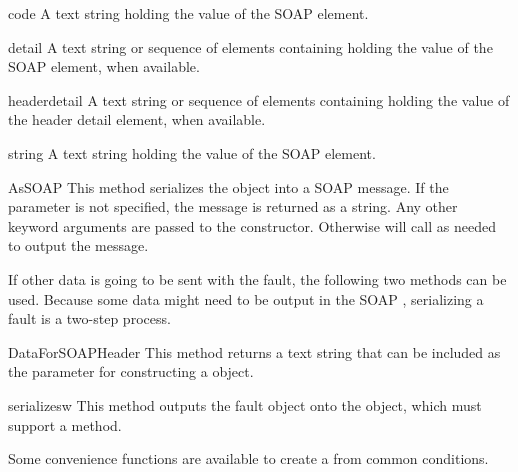 \begin{memberdesc}{code}
A text string holding the value of the SOAP  element.
\end{memberdesc}

\begin{memberdesc}{detail}
A text string or sequence of elements containing holding the value of the
SOAP  element, when available.
\end{memberdesc}

\begin{memberdesc}{headerdetail}
A text string or sequence of elements containing holding the value of the
\ZSI{} header detail element, when available.
\end{memberdesc}

\begin{memberdesc}{string}
A text string holding the value of the SOAP  element.
\end{memberdesc}

\begin{methoddesc}{AsSOAP}{}
This method serializes the  object into a SOAP message.
If the  parameter is not specified, the message is returned
as a string.
Any other keyword arguments are passed to the  constructor.
Otherwise  will call  as needed
to output the message.
\end{methoddesc}

If other data is going to be sent with the fault, the following
two methods can be used.
Because some data might need to be output in the SOAP ,
serializing a fault is a two-step process.

\begin{methoddesc}{DataForSOAPHeader}{}
This method returns a text string that can be included as the
 parameter for constructing a  object.
\end{methoddesc}

\begin{methoddesc}{serialize}{sw}
This method outputs the fault object onto the  object,
which must support a  method.
\end{methoddesc}

Some convenience functions are available to create a 
from common conditions.

